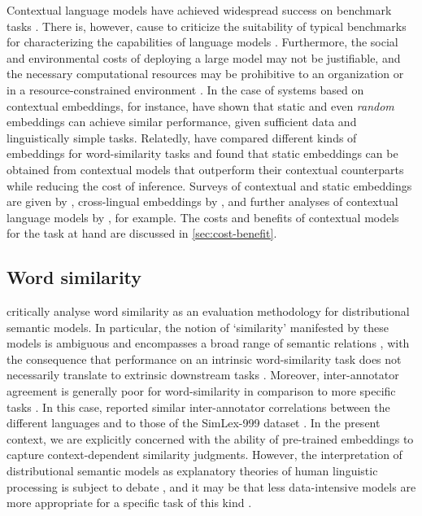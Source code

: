 Contextual language models have achieved widespread success on benchmark tasks
\parencite[22-27]{Bommasani2022}.
There is, however, cause to criticize the suitability of typical benchmarks for
characterizing the capabilities of language models \parencite[5-6]{Srivastava2023}.
Furthermore, the social and environmental costs of deploying a large model may not be
justifiable, and the necessary computational resources may be prohibitive to an
organization or in a resource-constrained environment
\parencite[142-145,154]{Bommasani2022}.
In the case of systems based on contextual embeddings, for instance,
\textcite{Arora2020} have shown that static and even \emph{random} embeddings can
achieve similar performance, given sufficient data and linguistically simple tasks.
Relatedly, \textcites[5244-5246]{Gupta2019}[4760-4762]{Bommasani2020} have compared
different kinds of embeddings for word-similarity tasks and found that static
embeddings can be obtained from contextual models that outperform their contextual
counterparts while reducing the cost of inference.
Surveys of contextual and static embeddings are given by
\textcites{Liu2020}{Torregrossa2021}, cross-lingual embeddings by \textcite{Ruder2019},
and further analyses of contextual language models by
\textcites{Reif2019}{Brunner2019}, for example.
The costs and benefits of contextual models for the task at hand are discussed in
\cref{sec:cost-benefit}.

\subsection{Word similarity}

\textcite{Batchkarov2016} critically analyse word similarity as an evaluation
methodology for distributional semantic models.
In particular, the notion of `similarity' manifested by these models is ambiguous
\parencite{Elekes2020} and encompasses a broad range of semantic relations
\parencite[2]{Pado2003}, with the consequence that performance on an intrinsic
word-similarity task does not necessarily translate to extrinsic downstream tasks
\parencite[7-8]{Batchkarov2016}.
Moreover, inter-annotator agreement is generally poor for word-similarity in comparison
to more specific tasks \parencite[8-9]{Batchkarov2016}.
In this case, \textcites[8]{Armendariz2020}[42]{Armendariz2020a} reported similar
inter-annotator correlations between the different languages and to those of the
SimLex-999 dataset \parencite[678-680]{Hill2015}.
In the present context, we are explicitly concerned with the ability of pre-trained
embeddings to capture context-dependent similarity judgments.
However, the interpretation of distributional semantic models as explanatory theories
of human linguistic processing is subject to debate \parencite{Gunther2019}, and it may
be that less data-intensive models are more appropriate for a specific task of this
kind \parencite{DeDeyne2016}.
